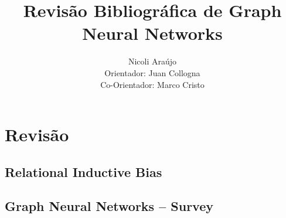 \documentclass[12pt]{article}
\title{Revisão Bibliográfica de Graph Neural Networks}
\author{Nicoli Araújo\\
Orientador: Juan Collogna\\
Co-Orientador: Marco Cristo
}
\begin{document}

\maketitle

\section{Revisão }\label{sec:consid_finais}
    \subsection{Relational Inductive Bias}

    \subsection{Graph Neural Networks -- Survey}



\end{document}
